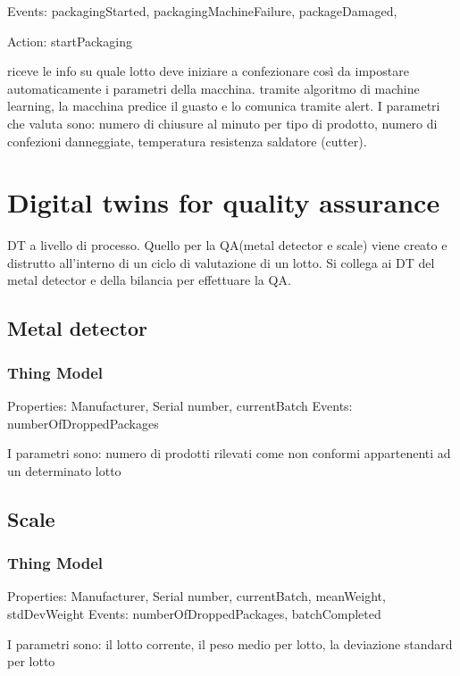Events: packagingStarted, packagingMachineFailure, packageDamaged,

Action: startPackaging


riceve le info su quale lotto deve iniziare a confezionare così da impostare automaticamente i parametri della macchina.
tramite algoritmo di machine learning, la macchina predice il guasto e lo comunica tramite alert.
I parametri che valuta sono: numero di chiusure al minuto per tipo di prodotto, numero di confezioni danneggiate, temperatura resistenza saldatore (cutter).

\section{Digital twins for quality assurance}
DT a livello di processo. Quello per la QA(metal detector e scale) viene creato e distrutto all'interno di un ciclo di valutazione di un lotto.
Si collega ai DT del metal detector e della bilancia per effettuare la QA.
\subsection{Metal detector}
\subsubsection{Thing Model}
Properties: Manufacturer, Serial number, currentBatch
Events: numberOfDroppedPackages

I parametri sono:
numero di prodotti rilevati come non conformi appartenenti ad un determinato lotto

\subsection{Scale}
\subsubsection{Thing Model}
Properties: Manufacturer, Serial number, currentBatch, meanWeight, stdDevWeight
Events: numberOfDroppedPackages, batchCompleted

I parametri sono:
il lotto corrente, il peso medio per lotto, la deviazione standard per lotto

